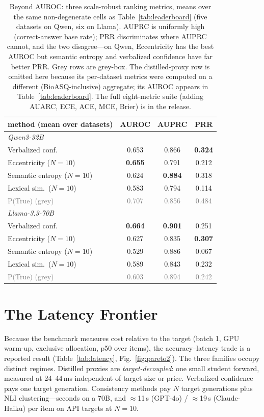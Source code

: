 \documentclass[11pt]{article}
\newcommand{\best}[1]{\textbf{#1}}
\newcommand{\grey}[1]{\textcolor{gray}{#1}}
\begin{document}
\begin{table}[t]\centering\small
\setlength{\tabcolsep}{4pt}
\begin{tabular}{l ccc}
\toprule
method (mean over datasets) & AUROC & AUPRC & PRR\\
\midrule
\multicolumn{4}{l}{\emph{Qwen3-32B}}\\
Verbalized conf.        & 0.653 & 0.866 & \best{0.324}\\
Eccentricity ($N{=}10$) & \best{0.655} & 0.791 & 0.212\\
Semantic entropy ($N{=}10$) & 0.624 & \best{0.884} & 0.318\\
Lexical sim.\ ($N{=}10$)& 0.583 & 0.794 & 0.114\\
\grey{P(True) (grey)}   & \grey{0.707} & \grey{0.856} & \grey{0.484}\\
\midrule
\multicolumn{4}{l}{\emph{Llama-3.3-70B}}\\
Verbalized conf.        & \best{0.664} & \best{0.901} & 0.251\\
Eccentricity ($N{=}10$) & 0.627 & 0.835 & \best{0.307}\\
Semantic entropy ($N{=}10$) & 0.529 & 0.886 & 0.067\\
Lexical sim.\ ($N{=}10$)& 0.589 & 0.843 & 0.232\\
\grey{P(True) (grey)}   & \grey{0.603} & \grey{0.894} & \grey{0.242}\\
\bottomrule
\end{tabular}
\caption{Beyond AUROC: three scale-robust ranking metrics, means over the same
non-degenerate cells as Table~\ref{tab:leaderboard} (five datasets on Qwen, six on Llama).
AUPRC is uniformly high (correct-answer base rate); PRR discriminates where AUPRC cannot,
and the two disagree---on Qwen, Eccentricity has the best AUROC but semantic entropy and
verbalized confidence have far better PRR. Grey rows are grey-box. The distilled-proxy row is
omitted here because its per-dataset metrics were computed on a different (BioASQ-inclusive)
aggregate; its AUROC appears in Table~\ref{tab:leaderboard}. The full eight-metric suite
(adding AUARC, ECE, ACE, MCE, Brier) is in the release.}
\label{tab:metrics}
\end{table}

\section{The Latency Frontier}\label{sec:latency}
Because the benchmark measures cost relative to the target (batch 1, GPU warm-up,
exclusive allocation, p50 over items), the accuracy--latency trade is a reported result
(Table~\ref{tab:latency}, Fig.~\ref{fig:pareto2}). The three families occupy distinct regimes. Distilled proxies
are \emph{target-decoupled}: one small student forward, measured at 24--44\,ms
independent of target size or price. Verbalized confidence pays one target generation.
Consistency methods pay $N$ target generations plus NLI clustering---seconds on a 70B, and
$\approx$11\,s (GPT-4o) / $\approx$19\,s (Claude-Haiku) per item on API targets at
$N{=}10$.
\end{document}
